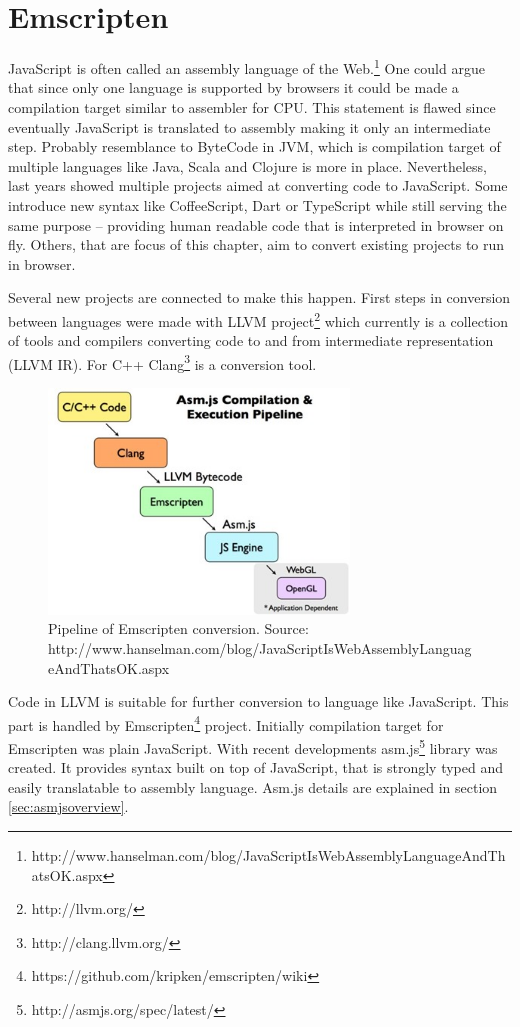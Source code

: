 \chapter{Emscripten}
\label{cha:emscripten}

JavaScript is often called an assembly language of the Web.\footnote{http://www.hanselman.com/blog/JavaScriptIsWebAssemblyLanguageAndThatsOK.aspx} One could argue that since only one language is supported by browsers it could be made a compilation target similar to assembler for CPU. This statement is flawed since eventually JavaScript is translated to assembly making it only an intermediate step. Probably resemblance to ByteCode in JVM, which is compilation target of multiple languages like Java, Scala and Clojure is more in place.
Nevertheless, last years showed multiple projects aimed at converting code to JavaScript. Some introduce new syntax like CoffeeScript, Dart or TypeScript while still serving the same purpose -- providing human readable code that is interpreted in browser on fly. Others, that are focus of this chapter, aim to convert existing projects to run in browser.

Several new projects are connected to make this happen. First steps in conversion between languages were made with LLVM project\footnote{http://llvm.org/} which currently is a collection of tools and compilers converting code to and from intermediate representation (LLVM IR). For C++ Clang\footnote{http://clang.llvm.org/} is a conversion tool.

\begin{figure}[h!]
  \caption{Pipeline of Emscripten conversion. Source: http://www.hanselman.com/blog/JavaScriptIsWebAssemblyLanguageAndThatsOK.aspx}
  \label{img:emscriptenpipeline}
  \centering
	\includegraphics[width=8cm]{emscripten/pipeline.jpg}
\end{figure}

Code in LLVM is suitable for further conversion to language like JavaScript. This part is handled by Emscripten\footnote{https://github.com/kripken/emscripten/wiki} project. Initially compilation target for Emscripten was plain JavaScript. With recent developments asm.js\footnote{http://asmjs.org/spec/latest/} library was created. It provides syntax built on top of JavaScript, that is strongly typed and easily translatable to assembly language. Asm.js details are explained in section \ref{sec:asmjsoverview}.

